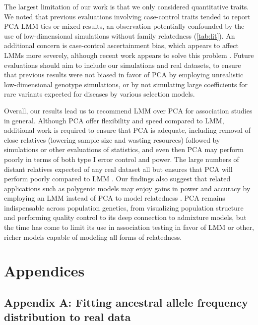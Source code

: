 \documentclass[11pt]{article}
\begin{document}
\begin{linenumbers}
The largest limitation of our work is that we only considered quantitative traits.
We noted that previous evaluations involving case-control traits tended to report PCA-LMM ties or mixed results, an observation potentially confounded by the use of low-dimensional simulations without family relatedness (\cref{tab:lit}).
An additional concern is case-control ascertainment bias, which appears to affect LMMs more severely, although recent work appears to solve this problem \citep{yang_advantages_2014, zhou_efficiently_2018}.
Future evaluations should aim to include our simulations and real datasets, to ensure that previous results were not biased in favor of PCA by employing unrealistic low-dimensional genotype simulations, or by not simulating large coefficients for rare variants expected for diseases by various selection models.

Overall, our results lead us to recommend LMM over PCA for association studies in general.
Although PCA offer flexibility and speed compared to LMM, additional work is required to ensure that PCA is adequate, including removal of close relatives (lowering sample size and wasting resources) followed by simulations or other evaluations of statistics, and even then PCA may perform poorly in terms of both type I error control and power.
The large numbers of distant relatives expected of any real dataset all but ensures that PCA will perform poorly compared to LMM \citep{henn_cryptic_2012, shchur_number_2018, loh_mixed-model_2018}.
Our findings also suggest that related applications such as polygenic models may enjoy gains in power and accuracy by employing an LMM instead of PCA to model relatedness \citep{rakitsch_lasso_2013,qian_fast_2020}.
PCA remains indispensable across population genetics, from visualizing population structure and performing quality control to its deep connection to admixture models, but the time has come to limit its use in association testing in favor of LMM or other, richer models capable of modeling all forms of relatedness.


\section{Appendices}

\subsection{Appendix A: Fitting ancestral allele frequency distribution to real data}


\end{linenumbers}
\end{document}
